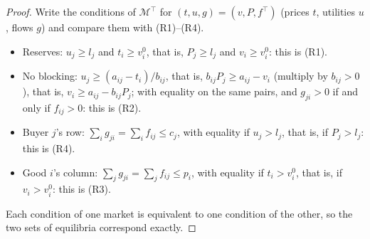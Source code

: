 \begin{proof}
Write the conditions of $\mathcal M^\top$ for $(t,u,g)=(v,P,f^\top)$ (prices $t$, utilities $u$, flows
$g$) and compare them with (R1)--(R4).
\begin{itemize}[nosep]
\item Reserves: $u_j\ge l_j$ and $t_i\ge v_i^0$, that is, $P_j\ge l_j$ and $v_i\ge v_i^0$: this is (R1).
\item No blocking: $u_j\ge(a_{ij}-t_i)/b_{ij}$, that is, $b_{ij}P_j\ge a_{ij}-v_i$ (multiply by
$b_{ij}>0$), that is, $v_i\ge a_{ij}-b_{ij}P_j$; with equality on the same pairs, and $g_{ji}>0$ if and
only if $f_{ij}>0$: this is (R2).
\item Buyer $j$'s row: $\sum_ig_{ji}=\sum_if_{ij}\le c_j$, with equality if $u_j>l_j$, that is, if
$P_j>l_j$: this is (R4).
\item Good $i$'s column: $\sum_jg_{ji}=\sum_jf_{ij}\le p_i$, with equality if $t_i>v_i^0$, that is, if
$v_i>v_i^0$: this is (R3).
\end{itemize}
Each condition of one market is equivalent to one condition of the other, so the two sets of
equilibria correspond exactly.
\end{proof}

